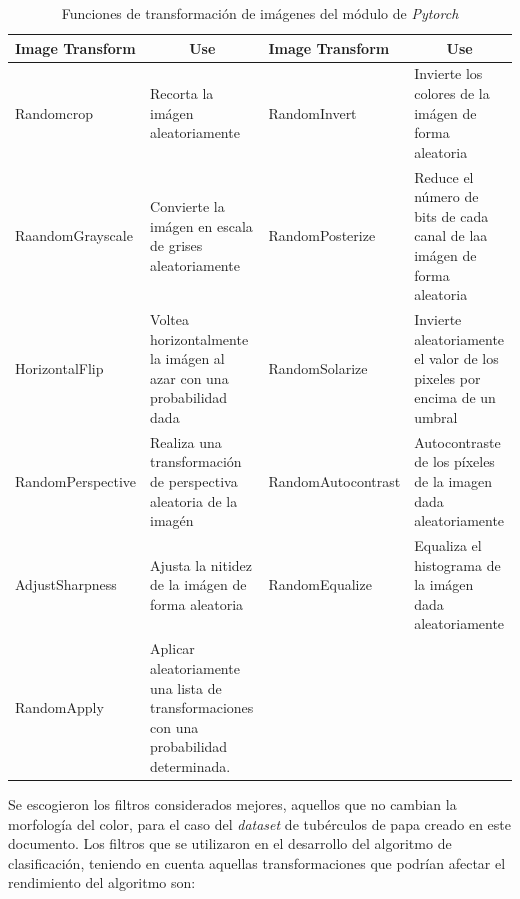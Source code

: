 \newpage
\begin{table}[ht]
	\centering
	\begin{tabular}{|p{3.5cm}|p{3.5cm}|p{3.8cm}|p{3.5cm}|}
		\hline
		Image Transform       & \multicolumn{1}{c|}{Use}                                                               & Image Transform       & \multicolumn{1}{c|}{Use}                                                \\ \hline
		Randomcrop            & Recorta la imágen aleatoriamente                                                       & RandomInvert          & Invierte los colores de la imágen de forma aleatoria                    \\ \hline
		RaandomGrayscale      & Convierte la imágen en escala de grises aleatoriamente                                 & RandomPosterize       & Reduce el número de bits de cada canal de laa imágen de forma aleatoria \\ \hline
		HorizontalFlip  & Voltea horizontalmente la imágen al azar con una probabilidad dada                     & RandomSolarize        & Invierte aleatoriamente el valor de los pixeles por encima de un umbral \\ \hline
		RandomPerspective     & Realiza una transformación de perspectiva aleatoria de la imagén                       & RandomAutocontrast    & Autocontraste de los píxeles de la imagen dada aleatoriamente           \\ \hline
		AdjustSharpness & Ajusta la nitidez de la imágen de forma aleatoria                                      & RandomEqualize        & Equaliza el histograma de la imágen dada aleatoriamente                 \\ \hline
		RandomApply           & Aplicar aleatoriamente una lista de transformaciones con una probabilidad determinada. & \multicolumn{1}{l|}{} &                                                                         \\ \hline
	\end{tabular}				
	\caption{Funciones de transformación de imágenes del módulo de \textit{Pytorch}}
	\label{table:filters2}
\end{table}

Se escogieron los filtros considerados mejores, aquellos que no cambian la morfología del color, para el caso del \textit{dataset} de tubérculos de papa creado en este documento. Los filtros que se utilizaron en el desarrollo del algoritmo de clasificación, teniendo en cuenta aquellas transformaciones que podrían afectar el rendimiento del algoritmo son:


